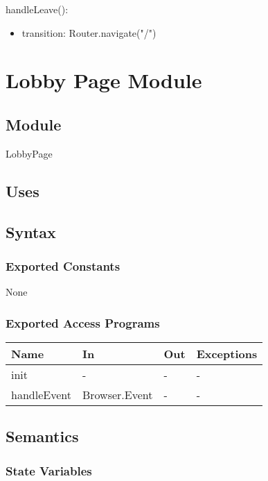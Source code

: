 \documentclass[12pt, titlepage]{article}
\begin{document}
\noindent handleLeave():
\begin{itemize}
\item transition: Router.navigate("/")
\end{itemize}

\newpage

\section{Lobby Page Module} \label{LobbyPage}

\subsection{Module}
LobbyPage

\subsection{Uses}

\subsection{Syntax}

\subsubsection{Exported Constants}
None

\subsubsection{Exported Access Programs}

\begin{center}
\begin{tabular}{p{2cm} p{2cm} p{2cm} p{5cm}}
\hline
\textbf{Name} & \textbf{In} & \textbf{Out} & \textbf{Exceptions} \\
\hline
init & - & - & - \\
handleEvent & Browser.Event & - & -\\
\hline
\end{tabular}
\end{center}

\subsection{Semantics}

\subsubsection{State Variables}
\end{document}
